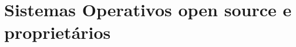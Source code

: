 \section{Sistemas Operativos open source e proprietários} \label{section: sistemas operativos}
\lipsum[1-8]